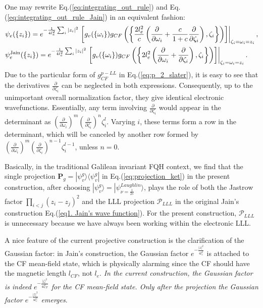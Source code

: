 One may rewrite Eq.(\ref{eq:integrating_out_rule}) and Eq.(\ref{eq:integrating_out_rule_Jain}) in an equivalent fashion:
\begin{align}
     & \psi_e(\{z_i\})=e^{-\frac{1}{4l_e^2}\sum_i |z_i|^2}\left.\left[g_v(\{\omega_i\})g_{CF}\left(\left\{\frac{2l_e^2}{c}\left(\frac{\partial}{\partial \omega_i}+\frac{c}{1+c}\frac{\partial}{\partial \zeta_i}\right),\zeta_i\right\}\right)\right]\right|_{\zeta_i=\omega_i=z_i},\notag \\
     & \psi^{\text{Jain}}_e(\{z_i\})=e^{-\frac{1}{4l_e^2}\sum_i |z_i|^2}\left.\left[g_v(\{\omega_i\})g_{CF}\left(\left\{2l_e^2\left(\frac{\partial}{\partial \omega_i}+\frac{\partial}{\partial \zeta_i}\right), \zeta_i\right\}\right)\right]\right|_{\zeta_i=\omega_i=z_i}.
\end{align}
Due to the particular form of $g^{p-LL}_{CF}$ in Eq.(\ref{eq:p_2_slater}), it is easy to see that the derivatives $\frac{\partial}{\partial \zeta_i}$ can be neglected in both expressions. Consequently, up to the unimportant overall normalization factor, they give identical electronic wavefunctions. Essentially, any term involving $\frac{\partial}{\partial \zeta_i}$ would appear in the determinant as $(\frac{\partial}{\partial\omega_i})^m (\frac{\partial}{\partial\zeta_i})^n \zeta_i^l$. Varying $i$, these terms form a row in the determinant, which will be canceled by another row formed by $(\frac{\partial}{\partial\omega_i})^m (\frac{\partial}{\partial\zeta_i})^{n-1} \zeta_i^{l-1}$, unless $n=0$.

Basically, in the traditional Galilean invariant FQH context, we find that the single projection $\mathbf P_g=|\psi_v^g\rangle\langle \psi_v^g|$ in Eq.(\ref{eq:projection_ket}) in the present construction, after choosing $|\psi_v^g\rangle=|\psi^{Laughlin}_{\nu=\frac{1}{2s}}\rangle$, plays the role of both the Jastrow factor $\prod_{i<j}(z_i-z_j)^2$ and the LLL projection $\mathcal P_{LLL}$ in the original Jain's construction Eq.(\ref{eq1. Jain's wave function}). For the present construction, $\mathcal P_{LLL}$ is unnecessary because we have always been working within the electronic LLL.

A nice feature of the current projective construction is the clarification of the Gaussian factor: in Jain's construction, the Gaussian factor $e^{-\frac{|z|^2}{4l_e^2}}$ is attached to the CF mean-field state, which is physically alarming since the CF should have the magnetic length $l_{CF}$, not $l_e$. \emph{In the current construction, the Gaussian factor is indeed $e^{-\frac{|\zeta|^2}{4l_{CF}^2}}$ for the CF mean-field state. Only after the projection the Gaussian factor $e^{-\frac{|z|^2}{4l_e^2}}$ emerges}.



